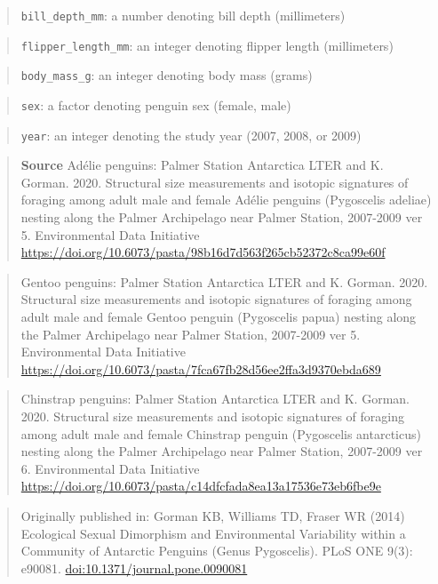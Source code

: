 \documentclass[letterpaper,9pt,twoside,]{pinp}
\begin{document}
\begin{quote}
\texttt{bill\_depth\_mm}: a number denoting bill depth (millimeters)
\end{quote}

\begin{quote}
\texttt{flipper\_length\_mm}: an integer denoting flipper length
(millimeters)
\end{quote}

\begin{quote}
\texttt{body\_mass\_g}: an integer denoting body mass (grams)
\end{quote}

\begin{quote}
\texttt{sex}: a factor denoting penguin sex (female, male)
\end{quote}

\begin{quote}
\texttt{year}: an integer denoting the study year (2007, 2008, or 2009)
\end{quote}

\begin{quote}
\textbf{Source} Adélie penguins: Palmer Station Antarctica LTER and K.
Gorman. 2020. Structural size measurements and isotopic signatures of
foraging among adult male and female Adélie penguins (Pygoscelis
adeliae) nesting along the Palmer Archipelago near Palmer Station,
2007-2009 ver 5. Environmental Data Initiative
\url{https://doi.org/10.6073/pasta/98b16d7d563f265cb52372c8ca99e60f}
\end{quote}

\begin{quote}
Gentoo penguins: Palmer Station Antarctica LTER and K. Gorman. 2020.
Structural size measurements and isotopic signatures of foraging among
adult male and female Gentoo penguin (Pygoscelis papua) nesting along
the Palmer Archipelago near Palmer Station, 2007-2009 ver 5.
Environmental Data Initiative
\url{https://doi.org/10.6073/pasta/7fca67fb28d56ee2ffa3d9370ebda689}
\end{quote}

\begin{quote}
Chinstrap penguins: Palmer Station Antarctica LTER and K. Gorman. 2020.
Structural size measurements and isotopic signatures of foraging among
adult male and female Chinstrap penguin (Pygoscelis antarcticus) nesting
along the Palmer Archipelago near Palmer Station, 2007-2009 ver 6.
Environmental Data Initiative
\url{https://doi.org/10.6073/pasta/c14dfcfada8ea13a17536e73eb6fbe9e}
\end{quote}

\begin{quote}
Originally published in: Gorman KB, Williams TD, Fraser WR (2014)
Ecological Sexual Dimorphism and Environmental Variability within a
Community of Antarctic Penguins (Genus Pygoscelis). PLoS ONE 9(3):
e90081. \url{doi:10.1371/journal.pone.0090081}
\end{quote}


\pnasbreak 
\end{document}
